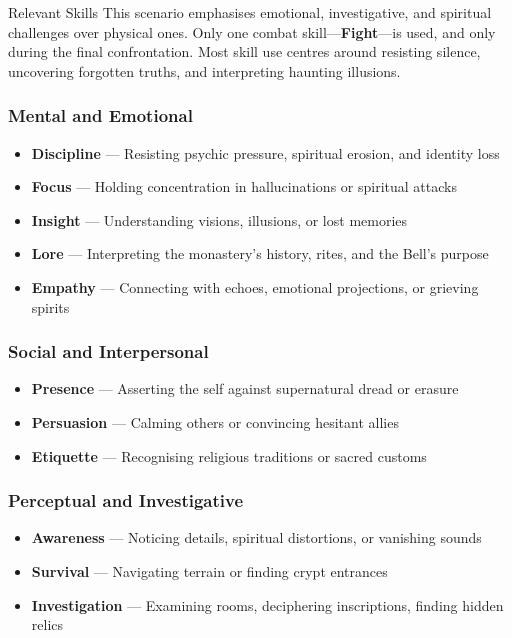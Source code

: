 \documentclass[nodeprecatedcode,bg=print]{dndbook/dndbook}
\begin{document}
\begin{WyrdSidebar}{Relevant Skills}
    This scenario emphasises emotional, investigative, and spiritual challenges over physical ones. Only one combat skill—\textbf{Fight}—is used, and only during the final confrontation. Most skill use centres around resisting silence, uncovering forgotten truths, and interpreting haunting illusions.
    
    \vspace{0.5\baselineskip}
    
    \subsubsection{Mental and Emotional}
    \begin{itemize}
        \item \textbf{Discipline} — Resisting psychic pressure, spiritual erosion, and identity loss
        \item \textbf{Focus} — Holding concentration in hallucinations or spiritual attacks
        \item \textbf{Insight} — Understanding visions, illusions, or lost memories
        \item \textbf{Lore} — Interpreting the monastery’s history, rites, and the Bell’s purpose
        \item \textbf{Empathy} — Connecting with echoes, emotional projections, or grieving spirits
    \end{itemize}
    
    \subsubsection{Social and Interpersonal}
    \begin{itemize}
        \item \textbf{Presence} — Asserting the self against supernatural dread or erasure
        \item \textbf{Persuasion} — Calming others or convincing hesitant allies
        \item \textbf{Etiquette} — Recognising religious traditions or sacred customs
    \end{itemize}
    
    \subsubsection{Perceptual and Investigative}
    \begin{itemize}
        \item \textbf{Awareness} — Noticing details, spiritual distortions, or vanishing sounds
        \item \textbf{Survival} — Navigating terrain or finding crypt entrances
        \item \textbf{Investigation} — Examining rooms, deciphering inscriptions, finding hidden relics
    \end{itemize}
    

\end{WyrdSidebar}
\end{document}
